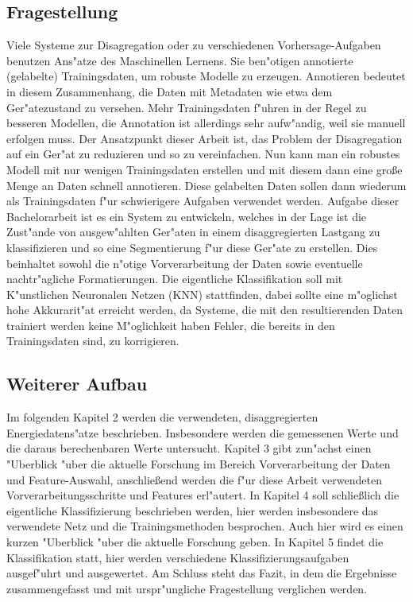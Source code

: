 \subsection{Fragestellung}
\label{Fragestellung}
 	Viele Systeme zur Disagregation oder zu verschiedenen Vorhersage-Aufgaben benutzen Ans"atze des Maschinellen Lernens. Sie ben"otigen annotierte (gelabelte) Trainingsdaten, um robuste Modelle zu erzeugen. Annotieren bedeutet in diesem Zusammenhang, die Daten mit Metadaten wie etwa dem Ger"atezustand zu versehen. Mehr Trainingsdaten f"uhren in der Regel zu besseren Modellen, die Annotation ist allerdings sehr aufw"andig, weil sie manuell erfolgen muss. Der Ansatzpunkt dieser Arbeit ist, das Problem der Disagregation auf ein Ger"at zu reduzieren und so zu vereinfachen. Nun kann man ein robustes Modell mit nur wenigen Trainingsdaten erstellen und mit diesem dann eine gro{\ss}e Menge an Daten schnell annotieren. Diese gelabelten Daten sollen dann wiederum als Trainingsdaten f"ur schwierigere Aufgaben verwendet werden. 
	Aufgabe dieser Bachelorarbeit ist es ein System zu entwickeln, welches in der Lage ist die Zust"ande von ausgew"ahlten Ger"aten in einem disaggregierten Lastgang zu klassifizieren und so eine Segmentierung f"ur diese Ger"ate zu erstellen. Dies beinhaltet sowohl die n"otige Vorverarbeitung der Daten sowie eventuelle nachtr"agliche Formatierungen. Die eigentliche Klassifikation soll mit K"unstlichen Neuronalen Netzen (KNN) stattfinden, dabei sollte eine m"oglichst hohe Akkurarit"at erreicht werden, da Systeme, die mit den resultierenden Daten trainiert werden keine M"oglichkeit haben Fehler, die bereits in den Trainingsdaten sind, zu korrigieren. 

\subsection{Weiterer Aufbau}
\label{Weiterer Aufbau}
	Im folgenden Kapitel 2 werden die verwendeten, disaggregierten Energiedatens"atze beschrieben. Insbesondere werden die gemessenen Werte und die daraus berechenbaren Werte untersucht. 
	Kapitel 3 gibt zun"achst einen "Uberblick "uber die aktuelle Forschung im Bereich Vorverarbeitung der Daten und Feature-Auswahl, anschlie{\ss}end werden die f"ur diese Arbeit verwendeten Vorverarbeitungsschritte und Features erl"autert.
	In Kapitel 4 soll schlie{\ss}lich die eigentliche Klassifizierung beschrieben werden, hier werden insbesondere das verwendete Netz und die Trainingsmethoden besprochen. Auch hier wird es einen kurzen "Uberblick "uber die aktuelle Forschung geben.
	In Kapitel 5 findet die Klassifikation statt, hier werden verschiedene Klassifizierungsaufgaben ausgef"uhrt und ausgewertet. 
	Am Schluss steht das Fazit, in dem die Ergebnisse zusammengefasst und mit urspr"ungliche Fragestellung verglichen werden. 